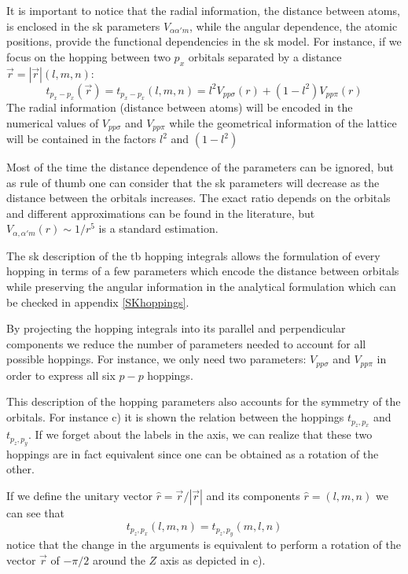 It is important to notice that the radial information, \ie the distance between atoms, is enclosed in the \ac{sk} parameters $V_{\alpha\alpha'm}$, while the angular dependence, \ie the atomic positions, provide the functional dependencies in the \ac{sk} model. For instance, if we focus on the hopping between two $p_x$ orbitals separated by a distance $\vec{r}=|\vec{r}|(l,m,n)$:
\begin{equation}
  t_{p_x-p_x}(\vec{r})=  t_{p_x-p_x}(l,m,n) = l^2 V_{pp\sigma}(r) + (1-l^2) V_{pp\pi}(r)
\end{equation}
The radial information (distance between atoms) will be encoded in the numerical values of $V_{pp\sigma}$ and $V_{pp\pi}$ while the geometrical information of the lattice will be contained in the factors $l^2$ and $(1-l^2)$

Most of the time the distance dependence of the parameters can be ignored, but as rule of thumb one can consider that the \ac{sk} parameters will decrease as the distance between the orbitals increases.
The exact ratio depends on the orbitals and different approximations can be found in the literature\cite{Harrison1930}, but $V_{\alpha,\alpha'm}(r)\sim1/r^5$ is a standard estimation.
\bigbreak


The \ac{sk} description of the \ac{tb} hopping integrals allows the formulation of every hopping in terms of a few parameters which encode the distance between orbitals while preserving the angular information in the analytical formulation which can be checked in appendix \ref{SKhoppings}.
\medbreak


By projecting the hopping integrals into its parallel and perpendicular components we reduce the number of parameters needed to account for all possible hoppings. For instance, we only need two parameters: $V_{pp\sigma}$ and $V_{pp\pi}$ in order to express all six $p-p$ hoppings.

This description of the hopping parameters also accounts for the symmetry of the orbitals. For instance c) it is shown the relation between the hoppings $t_{p_{z},p_{x}}$ and $t_{p_{z},p_{y}}$. If we forget about the labels in the axis, we can realize that these two hoppings are in fact equivalent since one can be obtained as a rotation of the other.

If we define the unitary vector $\hat{r} = \vec{r}/|\vec{r}|$ and its components $\hat{r}=(l,m,n)$ we can see that
\begin{equation}
  t_{p_{z},p_{x}} (l,m,n) = t_{p_{z},p_{y}}(m,l,n)
\end{equation}
notice that the change in the arguments is equivalent to perform a rotation of the vector $\vec{r}$ of $-\pi/2$ around the $Z$ axis as depicted in c).

